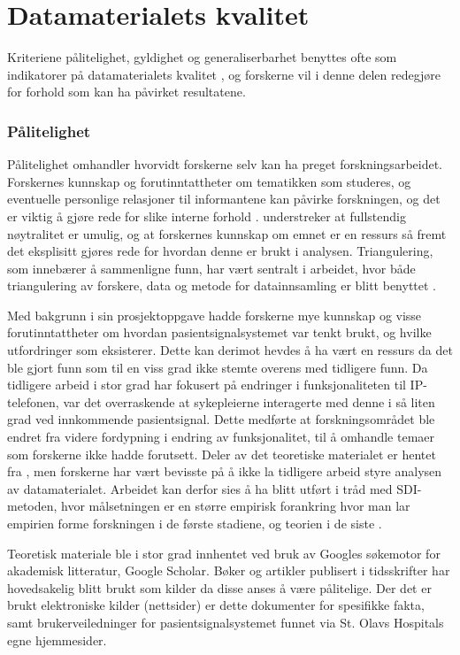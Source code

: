 \section{Datamaterialets kvalitet}
\label{kvalitativ_analyse}
Kriteriene pålitelighet, gyldighet og generaliserbarhet benyttes ofte som indikatorer på datamaterialets kvalitet \citep{Tjora}, og forskerne vil i denne delen redegjøre for forhold som kan ha påvirket resultatene. 

\subsubsection{Pålitelighet}
Pålitelighet omhandler hvorvidt forskerne selv kan ha preget forskningsarbeidet. Forskernes kunnskap og forutinntattheter om tematikken som studeres, og eventuelle personlige relasjoner til informantene kan påvirke forskningen, og det er viktig å gjøre rede for slike interne forhold \citep{Tjora}. \citet{Tjora} understreker at fullstendig nøytralitet er umulig, og at forskernes kunnskap om emnet er en ressurs så fremt det eksplisitt gjøres rede for hvordan denne er brukt i analysen. Triangulering, som innebærer å sammenligne funn, har vært sentralt i arbeidet, hvor både triangulering av forskere, data og metode for datainnsamling er blitt benyttet \citep{Oates}. 

\noindent
Med bakgrunn i sin prosjektoppgave hadde forskerne mye kunnskap og visse forutinntattheter om hvordan pasientsignalsystemet var tenkt brukt, og hvilke utfordringer som eksisterer. Dette kan derimot hevdes å ha vært en ressurs da det ble gjort funn som til en viss grad ikke stemte overens med tidligere funn. Da tidligere arbeid i stor grad har fokusert på endringer i funksjonaliteten til IP-telefonen, var det overraskende at sykepleierne interagerte med denne i så liten grad ved innkommende pasientsignal. Dette medførte at forskningsområdet ble endret fra videre fordypning i endring av funksjonalitet, til å omhandle temaer som forskerne ikke hadde forutsett. Deler av det teoretiske materialet er hentet fra \citep{Sund13}, men forskerne har vært bevisste på å ikke la tidligere arbeid styre analysen av datamaterialet. Arbeidet kan derfor sies å ha blitt utført i tråd med SDI-metoden, hvor målsetningen er en større empirisk forankring hvor man lar empirien forme forskningen i de første stadiene, og teorien i de siste \citep{Tjora}. 

\noindent
Teoretisk materiale ble i stor grad innhentet ved bruk av Googles søkemotor for akademisk litteratur, Google Scholar. Bøker og artikler publisert i tidsskrifter har hovedsakelig blitt brukt som kilder da disse anses å være pålitelige. Der det er brukt elektroniske kilder (nettsider) er dette dokumenter for spesifikke fakta, samt brukerveiledninger for pasientsignalsystemet funnet via St. Olavs Hospitals egne hjemmesider.

